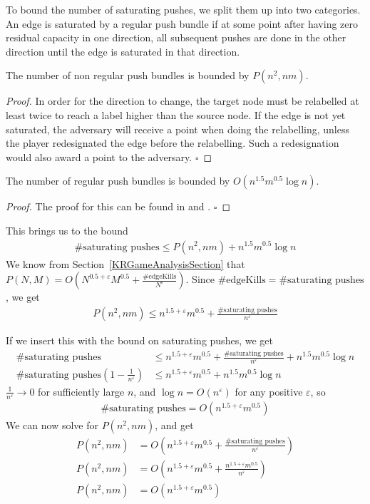 To bound the number of saturating pushes, we split them up into two categories. 
An edge is saturated by a regular push bundle if at some point after having zero residual capacity in one direction, all subsequent pushes are done in the other direction until the edge is saturated in that direction.
\begin{lemma}
The number of non regular push bundles is bounded by $P(n^2, nm)$.
\end{lemma}
\begin{proof}
In order for the direction to change, the target node must be relabelled at least twice to reach a label higher than the source node. 
If the edge is not yet saturated, the adversary will receive a point when doing the relabelling, unless the player redesignated the edge before the relabelling.
Such a redesignation would also award a point to the adversary.
$\square$
\end{proof}
\begin{lemma}
The number of regular push bundles is bounded by $O(n^{1.5}m^{0.5} \log n)$.
\end{lemma}
\begin{proof}
The proof for this can be found in \cite[Lemma~8.2]{Cheriyan1990} and \cite[Lemma~8.4]{Cheriyan1990}.
$\square$
\end{proof}
This brings us to the bound
\begin{align*}
\text{\#saturating pushes} \leq P(n^2, nm) + n^{1.5}m^{0.5} \log n 
\end{align*}
We know from Section~\ref{KRGameAnalysisSection} that 
$P(N, M) =O\left(N^{0.5+\varepsilon}M^{0.5} + \frac{\mathrm{\#edgeKills}}{N^{\varepsilon}}\right)$.
Since $\mathrm{\#edgeKills} = \text{\#saturating pushes}$, we get
\begin{align*}
P(n^2, nm) \leq n^{1.5+\varepsilon}m^{0.5} + \frac{\text{\#saturating pushes}}{n^{\varepsilon}}
\end{align*}

If we insert this with the bound on saturating pushes, we get
\begin{align*}
\text{\#saturating pushes} &\leq n^{1.5+\varepsilon}m^{0.5} + \frac{\text{\#saturating pushes}}{n^{\varepsilon}} + n^{1.5}m^{0.5} \log n\\
\text{\#saturating pushes}(1 - \frac{1}{n^{\varepsilon}}) &\leq n^{1.5+\varepsilon}m^{0.5}+ n^{1.5}m^{0.5} \log n
\end{align*}
$\frac{1}{n^{\varepsilon}} \to 0$ for sufficiently large $n$, and $\log n = O(n^\varepsilon)$ for any positive $\varepsilon$, so
\begin{align*}
\text{\#saturating pushes} = O\left( n^{1.5+\varepsilon}m^{0.5}\right)
\end{align*}
We can now solve for $P(n^2, nm)$, and get
\begin{align*}
P(n^2, nm) &=O\left( n^{1.5+\varepsilon}m^{0.5} + \frac{\text{\#saturating pushes}}{n^{\varepsilon}}\right)\\
P(n^2, nm) &=O\left( n^{1.5+\varepsilon}m^{0.5} + \frac{n^{1.5+\varepsilon}m^{0.5}}{n^{\varepsilon}}\right)\\
P(n^2, nm) &=O\left( n^{1.5+\varepsilon}m^{0.5}\right)
\end{align*}

